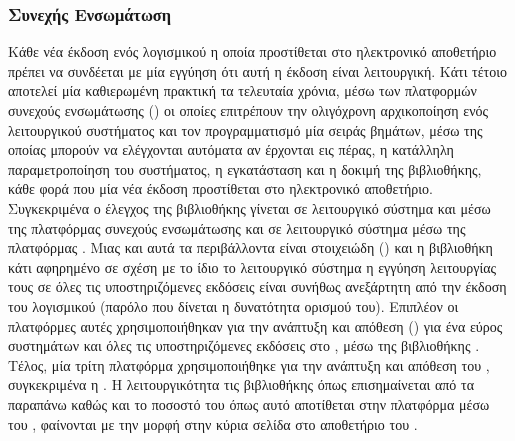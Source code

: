 \subsubsection{Συνεχής Ενσωμάτωση}
Κάθε νέα έκδοση ενός λογισμικού η οποία προστίθεται στο ηλεκτρονικό αποθετήριο \texttt{} πρέπει να συνδέεται με μία εγγύηση ότι αυτή η έκδοση είναι λειτουργική.
Κάτι τέτοιο αποτελεί μία καθιερωμένη πρακτική τα τελευταία χρόνια, μέσω των πλατφορμών συνεχούς ενσωμάτωσης () οι οποίες επιτρέπουν την ολιγόχρονη αρχικοποίηση ενός λειτουργικού συστήματος και τον προγραμματισμό μία σειράς βημάτων, μέσω της οποίας μπορούν να ελέγχονται αυτόματα αν έρχονται εις πέρας, η κατάλληλη παραμετροποίηση του συστήματος, η εγκατάσταση και η δοκιμή της βιβλιοθήκης, κάθε φορά που μία νέα έκδοση προστίθεται στο ηλεκτρονικό αποθετήριο.
Συγκεκριμένα ο έλεγχος της βιβλιοθήκης  γίνεται σε λειτουργικό σύστημα  και  μέσω της πλατφόρμας συνεχούς ενσωμάτωσης \href{https://travis-ci.org/ysig/GraKeL}{} και σε λειτουργικό σύστημα  μέσω της πλατφόρμας \href{https://ci.appveyor.com/project/ysig/grakel}{}.
Μιας και αυτά τα περιβάλλοντα είναι στοιχειώδη () και η βιβλιοθήκη κάτι αφηρημένο σε σχέση με το ίδιο το λειτουργικό σύστημα η εγγύηση λειτουργίας τους σε όλες τις υποστηριζόμενες εκδόσεις  είναι συνήθως ανεξάρτητη από την έκδοση του λογισμικού (παρόλο που δίνεται η δυνατότητα ορισμού του).
Επιπλέον οι πλατφόρμες αυτές χρησιμοποιήθηκαν για την ανάπτυξη και απόθεση ()  για ένα εύρος συστημάτων και όλες τις υποστηριζόμενες εκδόσεις  στο , μέσω της βιβλιοθήκης \href{https://github.com/joerick/cibuildwheel}{}.
Τέλος, μία τρίτη πλατφόρμα χρησιμοποιήθηκε για την ανάπτυξη και απόθεση του , συγκεκριμένα η \href{https://circleci.com/gh/ysig/GraKeL/tree/develop}{}.
Η λειτουργικότητα τις βιβλιοθήκης όπως επισημαίνεται από τα παραπάνω καθώς και το ποσοστό του  όπως αυτό αποτίθεται στην πλατφόρμα \href{https://codecov.io/gh/ysig/GraKeL}{} μέσω του , φαίνονται με την μορφή  στην κύρια σελίδα στο αποθετήριο του \href{https://github.com/ysig/GraKeL}{}.


